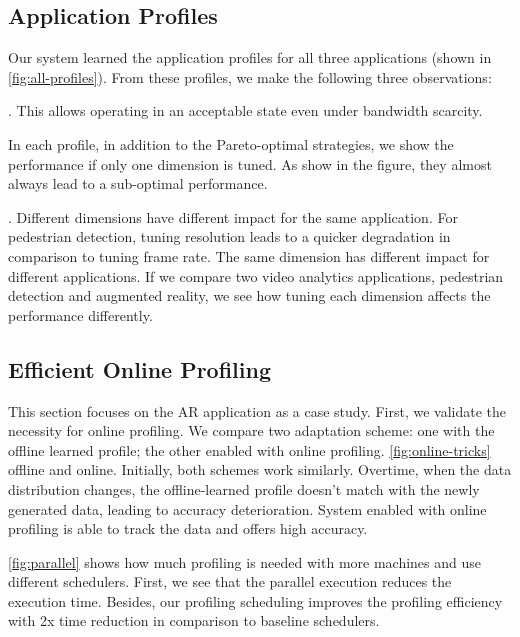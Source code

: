 \subsection{Application Profiles}
\label{sec:application-profiles}

Our system learned the application profiles for all three applications (shown in
\autoref{fig:all-profiles}). From these profiles, we make the following three
observations:

. This
allows operating in an acceptable state even under bandwidth scarcity.

 In each profile,
in addition to the Pareto-optimal strategies, we show the performance if only
one dimension is tuned. As show in the figure, they almost always lead to a
sub-optimal performance.

. Different dimensions have
different impact for the same application. For pedestrian detection, tuning
resolution leads to a quicker degradation in comparison to tuning frame
rate. The same dimension has different impact for different applications. If we
compare two video analytics applications, pedestrian detection and augmented
reality, we see how tuning each dimension affects the performance differently.

\lipsum[1-2]

\subsection{Efficient Online Profiling}
\label{sec:online-profiling}

This section focuses on the AR application as a case study. First, we validate
the necessity for online profiling. We compare two adaptation scheme: one with
the offline learned profile; the other enabled with online
profiling. \autoref{fig:online-tricks} offline and online. Initially, both
schemes work similarly. Overtime, when the data distribution changes, the
offline-learned profile doesn't match with the newly generated data, leading to
accuracy deterioration. System enabled with online profiling is able to track
the data and offers high accuracy.

\autoref{fig:parallel} shows how much profiling is needed with more machines and
use different schedulers. First, we see that the parallel execution reduces the
execution time. Besides, our profiling scheduling improves the profiling
efficiency with 2x time reduction in comparison to baseline schedulers.


